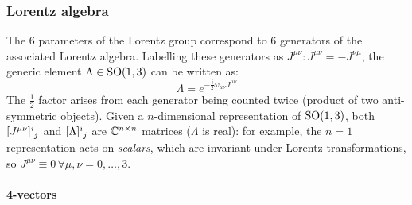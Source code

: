 \subsubsection{Lorentz algebra}

The 6 parameters of the Lorentz group correspond to 6 generators of the associated Lorentz algebra. Labelling these generators as $ J^{\mu \nu} : J^{\mu \nu} = - J^{\nu \mu} $, the generic element $ \Lambda \in \mathrm{SO}(1,3) $ can be written as:
\begin{equation}
  \Lambda = e^{- \frac{i}{2} \omega_{\mu \nu} J^{\mu \nu}}
  \label{eq:1.30}
\end{equation}
The $ \frac{1}{2} $ factor arises from each generator being counted twice (product of two anti-symmetric objects). Given a $ n $-dimensional representation of $ \mathrm{SO}(1,3) $, both $ \tensor{[J^{\mu \nu}]}{^i_j} $ and $ \tensor{[\Lambda]}{^i_j} $ are $ \mathbb{C}^{n \times n} $ matrices ($ \Lambda $ is real): for example, the $ n = 1 $ representation acts on \textit{scalars}, which are invariant under Lorentz transformations, so $ J^{\mu \nu} \equiv 0 \,\forall \mu,\nu = 0, \dots, 3 $.

\paragraph{4-vectors}


